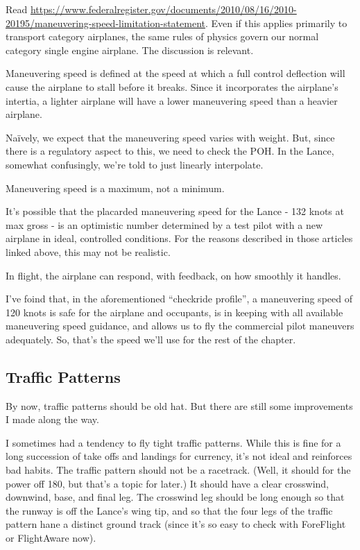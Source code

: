 Read \url{https://www.federalregister.gov/documents/2010/08/16/2010-20195/maneuvering-speed-limitation-statement}. Even if this applies primarily to transport category airplanes, the same rules of physics govern our normal category single engine airplane. The discussion is relevant.

Maneuvering speed is defined at the speed at which a full control deflection will cause the airplane to stall before it breaks. Since it incorporates the airplane's intertia, a lighter airplane will have a lower maneuvering speed than a heavier airplane.

Na\"ively, we expect that the maneuvering speed varies with weight. But, since there is a regulatory aspect to this, we need to check the POH. In the Lance, somewhat confusingly, we're told to just linearly interpolate.

Maneuvering speed is a maximum, not a minimum.

It's possible that the placarded maneuvering speed for the Lance - 132 knots at max gross - is an optimistic number determined by a test pilot with a new airplane in ideal, controlled conditions. For the reasons described in those articles linked above, this may not be realistic.

In flight, the airplane can respond, with feedback, on how smoothly it handles.

I've foind that, in the aforementioned ``checkride profile'', a maneuvering speed of 120 knots is safe for the airplane and occupants, is in keeping with all available maneuvering speed guidance, and allows us to fly the commercial pilot maneuvers adequately. So, that's the speed we'll use for the rest of the chapter.

\subsection{Traffic Patterns}

By now, traffic patterns should be old hat. But there are still some improvements I made along the way.

I sometimes had a tendency to fly tight traffic patterns. While this is fine for a long succession of take offs and landings for currency, it's not ideal and reinforces bad habits. The traffic pattern should not be a racetrack. (Well, it should for the power off 180, but that's a topic for later.) It should have a clear crosswind, downwind, base, and final leg. The crosswind leg should be long enough so that the runway is off the Lance's wing tip, and so that the four legs of the traffic pattern hane a distinct ground track (since it's so easy to check with ForeFlight or FlightAware now).

